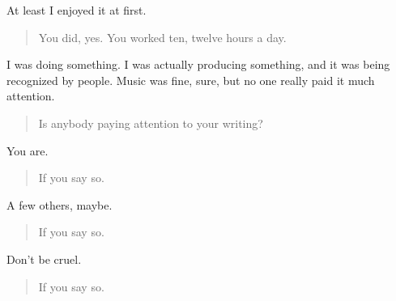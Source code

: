 At least I enjoyed it at first.

\begin{quote}
You did, yes. You worked ten, twelve hours a day.
\end{quote}

I was doing something. I was actually producing something, and it was being recognized by people. Music was fine, sure, but no one really paid it much attention.

\begin{quote}
Is anybody paying attention to your writing?
\end{quote}

You are.

\begin{quote}
If you say so.
\end{quote}

A few others, maybe.

\begin{quote}
If you say so.
\end{quote}

Don't be cruel.

\begin{quote}
If you say so.
\end{quote}
